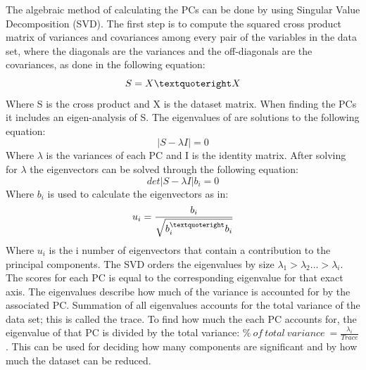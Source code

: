 The algebraic method of calculating the PCs can be done by using Singular Value Decomposition (SVD). The first step is to compute the squared cross product matrix of variances and covariances among every pair of the variables in the data set, where the diagonals are the variances and the off-diagonals are the covariances, as done in the following equation:
\begin{equation}
S = X \textquoteright X
\end{equation}
Where S is the cross product and X is the dataset matrix. When finding the PCs it includes an eigen-analysis of S. The eigenvalues of are solutions to the following equation:
\begin{equation}
| S - \lambda I |  = 0
\end{equation}
Where $\lambda$ is the variances of each PC and I is the identity matrix. After solving for $\lambda$ the eigenvectors can be solved through the following equation:
\begin{equation}
det | S - \lambda I | b_{i} = 0
\end{equation}
Where $b_{i}$ is used to calculate the eigenvectors as in:
\begin{eqnarray}
u_{i} = \frac{b_{i}}{\sqrt{b_{i}^{\textquoteright} b_{i}}}
\end{eqnarray}
Where $u_{i}$ is the i number of eigenvectors that contain a contribution to the principal components.
The SVD orders the eigenvalues by size $\lambda_{1} > \lambda_{2} … > \lambda_{i}$. The scores for each PC is equal to the corresponding eigenvalue for that exact axis. The eigenvalues describe how much of the variance is accounted for by the associated PC. Summation of all eigenvalues accounts for the total variance of the data set; this is called the trace. To find how much the each PC accounts for, the eigenvalue of that PC is divided by the total variance: $\%~ of~ total~ variance~ = \frac{\lambda_{i}}{Trace}$. This can be used for deciding how many components are significant and by how much the dataset can be reduced. \cite{Jolliffe1986}


